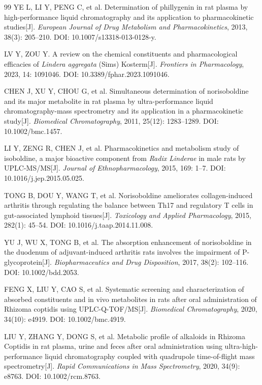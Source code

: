 \documentclass[12pt,a4paper,UTF8,openany]{ctexbook}
\begin{document}
\begin{thebibliography}{99}
YE L, LI Y, PENG C, et al. Determination of phillygenin in rat plasma by high-performance liquid chromatography and its application to pharmacokinetic studies[J]. \textit{European Journal of Drug Metabolism and Pharmacokinetics}, 2013, 38(3): 205--210. DOI: 10.1007/s13318-013-0128-y.

LV Y, ZOU Y. A review on the chemical constituents and pharmacological efficacies of \textit{Lindera aggregata} (Sims) Kosterm[J]. \textit{Frontiers in Pharmacology}, 2023, 14: 1091046. DOI: 10.3389/fphar.2023.1091046.

CHEN J, XU Y, CHOU G, et al. Simultaneous determination of norisoboldine and its major metabolite in rat plasma by ultra-performance liquid chromatography-mass spectrometry and its application in a pharmacokinetic study[J]. \textit{Biomedical Chromatography}, 2011, 25(12): 1283--1289. DOI: 10.1002/bmc.1457.

LI Y, ZENG R, CHEN J, et al. Pharmacokinetics and metabolism study of isoboldine, a major bioactive component from \textit{Radix Linderae} in male rats by UPLC-MS/MS[J]. \textit{Journal of Ethnopharmacology}, 2015, 169: 1--7. DOI: 10.1016/j.jep.2015.05.025.

TONG B, DOU Y, WANG T, et al. Norisoboldine ameliorates collagen-induced arthritis through regulating the balance between Th17 and regulatory T cells in gut-associated lymphoid tissues[J]. \textit{Toxicology and Applied Pharmacology}, 2015, 282(1): 45--54. DOI: 10.1016/j.taap.2014.11.008.

YU J, WU X, TONG B, et al. The absorption enhancement of norisoboldine in the duodenum of adjuvant-induced arthritis rats involves the impairment of P-glycoprotein[J]. \textit{Biopharmaceutics and Drug Disposition}, 2017, 38(2): 102--116. DOI: 10.1002/bdd.2053.

FENG X, LIU Y, CAO S, et al. Systematic screening and characterization of absorbed constituents and in vivo metabolites in rats after oral administration of Rhizoma coptidis using UPLC-Q-TOF/MS[J]. \textit{Biomedical Chromatography}, 2020, 34(10): e4919. DOI: 10.1002/bmc.4919.

LIU Y, ZHANG Y, DONG S, et al. Metabolic profile of alkaloids in Rhizoma Coptidis in rat plasma, urine and feces after oral administration using ultra-high-performance liquid chromatography coupled with quadrupole time-of-flight mass spectrometry[J]. \textit{Rapid Communications in Mass Spectrometry}, 2020, 34(9): e8763. DOI: 10.1002/rcm.8763.


\end{thebibliography}
\end{document}
